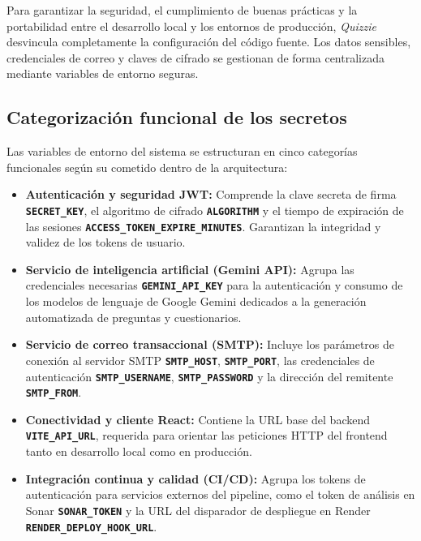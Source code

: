Para garantizar la seguridad, el cumplimiento de buenas prácticas y la portabilidad entre el desarrollo local y los entornos de producción, \textit{Quizzie} desvincula completamente la configuración del código fuente. Los datos sensibles, credenciales de correo y claves de cifrado se gestionan de forma centralizada mediante variables de entorno seguras.

\subsection{Categorización funcional de los secretos}\label{subsec:categorizacion_secretos}

Las variables de entorno del sistema se estructuran en cinco categorías funcionales según su cometido dentro de la arquitectura:

\begin{itemize}
    \item \textbf{Autenticación y seguridad JWT:} Comprende la clave secreta de firma \textbf{\texttt{SECRET\_KEY}}, el algoritmo de cifrado \textbf{\texttt{ALGORITHM}} y el tiempo de expiración de las sesiones \textbf{\texttt{ACCESS\_TOKEN\_EXPIRE\_MINUTES}}. Garantizan la integridad y validez de los tokens de usuario.
    \item \textbf{Servicio de inteligencia artificial (Gemini API):} Agrupa las credenciales necesarias \textbf{\texttt{GEMINI\_API\_KEY}} para la autenticación y consumo de los modelos de lenguaje de Google Gemini dedicados a la generación automatizada de preguntas y cuestionarios.
    \item \textbf{Servicio de correo transaccional (SMTP):} Incluye los parámetros de conexión al servidor SMTP \textbf{\texttt{SMTP\_HOST}}, \textbf{\texttt{SMTP\_PORT}}, las credenciales de autenticación \textbf{\texttt{SMTP\_USERNAME}}, \textbf{\texttt{SMTP\_PASSWORD}} y la dirección del remitente \textbf{\texttt{SMTP\_FROM}}.
    \item \textbf{Conectividad y cliente React:} Contiene la URL base del backend \textbf{\texttt{VITE\_API\_URL}}, requerida para orientar las peticiones HTTP del frontend tanto en desarrollo local como en producción.
    \item \textbf{Integración continua y calidad (CI/CD):} Agrupa los tokens de autenticación para servicios externos del pipeline, como el token de análisis en Sonar \textbf{\texttt{SONAR\_TOKEN}} y la URL del disparador de despliegue en Render \textbf{\texttt{RENDER\_DEPLOY\_HOOK\_URL}}.
\end{itemize}

